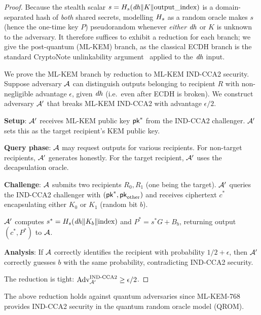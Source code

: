\begin{proof}
Because the stealth scalar $s = H_s(\mathit{dh} \| K \| \text{output\_index})$ is a
domain-separated hash of \emph{both} shared secrets, modelling $H_s$ as a
random oracle makes $s$ (hence the one-time key $P$) pseudorandom whenever
\emph{either} $\mathit{dh}$ or $K$ is unknown to the adversary. It therefore suffices
to exhibit a reduction for each branch; we give the post-quantum (ML-KEM)
branch, as the classical ECDH branch is the standard CryptoNote
unlinkability argument~\cite{cryptonote} applied to the $\mathit{dh}$ input.

We prove the ML-KEM branch by reduction to ML-KEM IND-CCA2 security. Suppose
adversary $\mathcal{A}$ can distinguish outputs belonging to recipient $R$ with
non-negligible advantage $\epsilon$, given $\mathit{dh}$ (i.e.\ even after ECDH is
broken). We construct adversary $\mathcal{A}'$ that breaks ML-KEM IND-CCA2 with
advantage $\epsilon/2$.

\textbf{Setup}: $\mathcal{A}'$ receives ML-KEM public key $\mathsf{pk}^*$ from the
IND-CCA2 challenger. $\mathcal{A}'$ sets this as the target recipient's
KEM public key.

\textbf{Query phase}: $\mathcal{A}$ may request outputs for various recipients.
For non-target recipients, $\mathcal{A}'$ generates honestly. For the target
recipient, $\mathcal{A}'$ uses the decapsulation oracle.

\textbf{Challenge}: $\mathcal{A}$ submits two recipients $R_0, R_1$ (one being
the target). $\mathcal{A}'$ queries the IND-CCA2 challenger with
$(\mathsf{pk}^*, \mathsf{pk}_{\text{other}})$ and receives ciphertext $c^*$ encapsulating
either $K_0$ or $K_1$ (random bit $b$).

$\mathcal{A}'$ computes $s^* = H_s(\mathit{dh} \| K_b \| \text{index})$ and
$P^* = s^*G + B_b$, returning output $(c^*, P^*)$ to $\mathcal{A}$.

\textbf{Analysis}: If $\mathcal{A}$ correctly identifies the recipient with
probability $1/2 + \epsilon$, then $\mathcal{A}'$ correctly guesses $b$ with
the same probability, contradicting IND-CCA2 security.

The reduction is tight: $\text{Adv}^{\text{IND-CCA2}}_{\mathcal{A}'} \geq \epsilon/2$.
\end{proof}

\begin{corollary}
The above reduction holds against quantum adversaries since ML-KEM-768
provides IND-CCA2 security in the quantum random oracle model (QROM).
\end{corollary}



